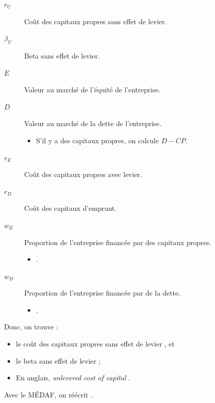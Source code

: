\documentclass[10pt, french]{article}
\begin{document}
\begin{multicols*}{2}
\begin{definitionNOHFILLsub}
\begin{distributions}[Notation]
\begin{description}
	\item[$r_{U}$]	Coût des capitaux propres sans effet de levier.
	\item[$\beta_{U}$]	Beta sans effet de levier.
	\item[$E$]	Valeur au marché de l'équité de l'entreprise.
	\item[$D$]	Valeur au marché de la dette de l'entreprise.
		\begin{itemize}
		\item	S'il y a des capitaux propres, on calcule $D - CP$.
		\end{itemize}
	\item[$r_{E}$]	Coût des capitaux propres avec levier.
	\item[$r_{D}$]	Coût des capitaux d'emprunt.
	\item[$w_{E}$]	Proportion de l'entreprise financée par des capitaux propres.
		\begin{itemize}
		\item	{}.
		\end{itemize}
	\item[$w_{D}$]	Proportion de l'entreprise financée par de la dette.
		\begin{itemize}
		\item	{}.
		\end{itemize}
\end{description}
\end{distributions}

Donc, on trouve : 
\begin{itemize}
	\item	le coût des capitaux propres sans effet de levier , et 
	\item	le beta sans effet de levier  ;
	\item	En anglais, \og \textit{unlevered cost of capital} \fg{}.
\end{itemize}
\end{definitionNOHFILLsub}

\begin{definitionNOHFILLprop}
Avec le MÉDAF, on réécrit .\\
\end{definitionNOHFILLprop}


\end{multicols*}
\end{document}
